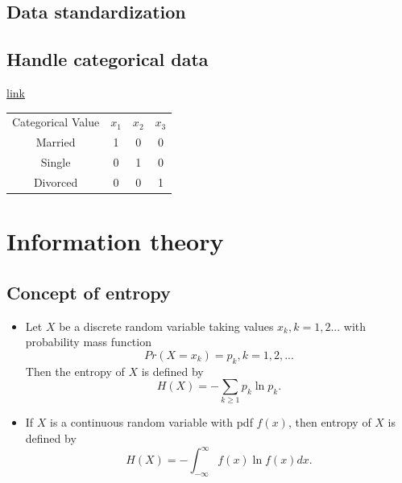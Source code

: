 \begin{refsection}
\subsection{Data standardization}







\subsection{Handle categorical data}

\href{https://www.analyticsvidhya.com/blog/2015/11/easy-methods-deal-categorical-variables-predictive-modeling/}{link}


\begin{table}[H]
	\begin{tabular}{cccc}
		Categorical Value & $x_1$ & $x_2$ & $x_3$ \\
		Married           & 1     & 0     & 0     \\
		Single            & 0     & 1     & 0     \\
		Divorced          & 0     & 0     & 1    
	\end{tabular}
\end{table}











\section{Information theory}


\subsection{Concept of entropy}

\begin{definition}\hfill
	\begin{itemize}
		\item 	Let $X$ be a discrete random variable taking values $x_k,k=1,2...$ with probability mass function 
		$$Pr(X = x_k) = p_k, k=1,2,...$$ 
		Then the entropy of $X$ is defined by
		$$H(X) = - \sum_{k\geq 1}p_k\ln p_k.$$
		\item If $X$ is a continuous random variable with pdf $f(x)$, then entropy of $X$ is defined by
		$$H(X) = -\int_{-\infty}^{\infty} f(x)\ln f(x) dx.$$
	\end{itemize}	
	

\end{definition}
\end{refsection}
